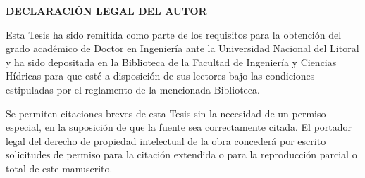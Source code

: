 \newpage
\thispagestyle{empty}
\vspace*{3em}
{\hfill\large \textbf{DECLARACIÓN LEGAL DEL AUTOR}\hfill\mbox{}}
\vspace{1em}

Esta Tesis ha sido remitida como parte de los requisitos para la obtención del grado académico de Doctor en Ingeniería ante la Universidad Nacional del Litoral
y ha sido depositada en la Biblioteca de la Facultad de Ingeniería y Ciencias Hídricas para que esté a disposición de sus lectores bajo las condiciones
estipuladas por el reglamento de la mencionada Biblioteca.

Se permiten citaciones breves de esta Tesis sin la necesidad de un permiso especial, en la suposición de que la fuente sea correctamente citada. El portador
legal del derecho de propiedad intelectual de la obra concederá por escrito solicitudes de permiso para la citación extendida o para la reproducción parcial o
total de este manuscrito.
